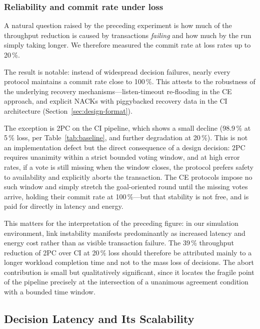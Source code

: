 \documentclass[journal]{IEEEtran}
\newcommand{\CI}{CI}                      %
\newcommand{\CE}{CE}                      %
\begin{document}
\subsubsection{Reliability and commit rate under loss}

A natural question raised by the preceding experiment is how much of the
throughput reduction is caused by transactions \emph{failing} and how
much by the run simply taking longer. We therefore measured the commit
rate at loss rates up to 20\,\%.

The result is notable: instead of widespread decision failures, nearly
every protocol maintains a commit rate close to 100\,\%. This attests to
the robustness of the underlying recovery mechanisms---listen-timeout
re-flooding in the \CE{} approach, and explicit NACKs with piggybacked
recovery data in the \CI{} architecture (Section~\ref{sec:design-format}).

The exception is 2PC on the \CI{} pipeline, which shows a small decline
(98.9\,\% at 5\,\% loss, per Table~\ref{tab:baseline}, and further
degradation at 20\,\%). This is not an implementation defect but the
direct consequence of a design decision: 2PC requires unanimity within a
strict bounded voting window, and at high error rates, if a vote is still
missing when the window closes, the protocol prefers safety to
availability and explicitly aborts the transaction. The \CE{} protocols
impose no such window and simply stretch the goal-oriented round until
the missing votes arrive, holding their commit rate at 100\,\%---but that
stability is not free, and is paid for directly in latency and energy.

This matters for the interpretation of the preceding figure: in our
simulation environment, link instability manifests predominantly as
increased latency and energy cost rather than as visible transaction
failure. The 39\,\% throughput reduction of 2PC over \CI{} at 20\,\% loss
should therefore be attributed mainly to a longer workload completion
time and not to the mass loss of decisions. The abort contribution is
small but qualitatively significant, since it locates the fragile point
of the pipeline precisely at the intersection of a unanimous agreement
condition with a bounded time window.

\subsection{Decision Latency and Its Scalability}
\label{sec:results-latency}
\end{document}
